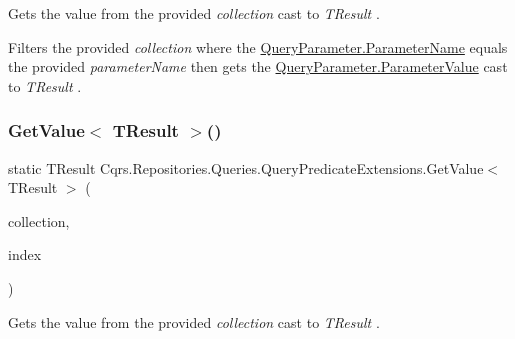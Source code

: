 Gets the value from the provided {\itshape collection}  cast to {\itshape T\+Result} . 

Filters the provided {\itshape collection}  where the \hyperlink{classCqrs_1_1Repositories_1_1Queries_1_1QueryParameter_a9e2242ad5acffe4e99d4945e4b88be8d_a9e2242ad5acffe4e99d4945e4b88be8d}{Query\+Parameter.\+Parameter\+Name} equals the provided {\itshape parameter\+Name}  then gets the \hyperlink{classCqrs_1_1Repositories_1_1Queries_1_1QueryParameter_a0d1c69ffc864aeda2eb515a9e57fbd7a_a0d1c69ffc864aeda2eb515a9e57fbd7a}{Query\+Parameter.\+Parameter\+Value} cast to {\itshape T\+Result} . \mbox{\label{classCqrs_1_1Repositories_1_1Queries_1_1QueryPredicateExtensions_a8544c5998b585aac97320e4205093ba3_a8544c5998b585aac97320e4205093ba3}} 
\subsubsection{\texorpdfstring{Get\+Value$<$ T\+Result $>$()}{GetValue< TResult >()}\hspace{0.1cm}{\footnotesize\ttfamily [6/7]}}
{\footnotesize\ttfamily static T\+Result Cqrs.\+Repositories.\+Queries.\+Query\+Predicate\+Extensions.\+Get\+Value$<$ T\+Result $>$ (\begin{DoxyParamCaption}\item[{this Sorted\+Set$<$ \hyperlink{classCqrs_1_1Repositories_1_1Queries_1_1QueryParameter}{Query\+Parameter} $>$}]{collection,  }\item[{int}]{index }\end{DoxyParamCaption})\hspace{0.3cm}{\ttfamily [static]}}



Gets the value from the provided {\itshape collection}  cast to {\itshape T\+Result} . 

